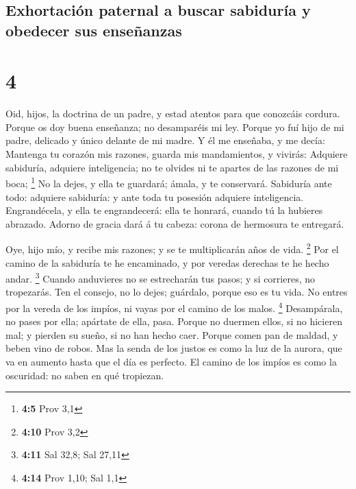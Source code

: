 \hypertarget{exhortaciuxf3n-paternal-a-buscar-sabiduruxeda-y-obedecer-sus-enseuxf1anzas}{%
\subsection{Exhortación paternal a buscar sabiduría y obedecer sus
enseñanzas}\label{exhortaciuxf3n-paternal-a-buscar-sabiduruxeda-y-obedecer-sus-enseuxf1anzas}}

\hypertarget{section-3}{%
\section{4}\label{section-3}}

 Oid, hijos, la doctrina de un padre, y estad atentos para
que conozcáis cordura.  Porque os doy buena enseñanza; no
desamparéis mi ley.  Porque yo fuí hijo de mi padre,
delicado y único delante de mi madre.  Y él me enseñaba, y
me decía: Mantenga tu corazón mis razones, guarda mis mandamientos, y
vivirás:  Adquiere sabiduría, adquiere inteligencia; no te
olvides ni te apartes de las razones de mi boca; \footnote{\textbf{4:5}
  Prov 3,1}  No la dejes, y ella te guardará; ámala, y te
conservará.  Sabiduría ante todo: adquiere sabiduría: y ante
toda tu posesión adquiere inteligencia.  Engrandécela, y
ella te engrandecerá: ella te honrará, cuando tú la hubieres abrazado.
 Adorno de gracia dará á tu cabeza: corona de hermosura te
entregará.

 Oye, hijo mío, y recibe mis razones; y se te multiplicarán
años de vida. \footnote{\textbf{4:10} Prov 3,2}  Por el
camino de la sabiduría te he encaminado, y por veredas derechas te he
hecho andar. \footnote{\textbf{4:11} Sal 32,8; Sal 27,11} 
Cuando anduvieres no se estrecharán tus pasos; y si corrieres, no
tropezarás.  Ten el consejo, no lo dejes; guárdalo, porque
eso es tu vida.  No entres por la vereda de los impíos, ni
vayas por el camino de los malos. \footnote{\textbf{4:14} Prov 1,10; Sal
  1,1}  Desampárala, no pases por ella; apártate de ella,
pasa.  Porque no duermen ellos, si no hicieren mal; y
pierden su sueño, si no han hecho caer.  Porque comen pan
de maldad, y beben vino de robos.  Mas la senda de los
justos es como la luz de la aurora, que va en aumento hasta que el día
es perfecto.  El camino de los impíos es como la oscuridad:
no saben en qué tropiezan.

